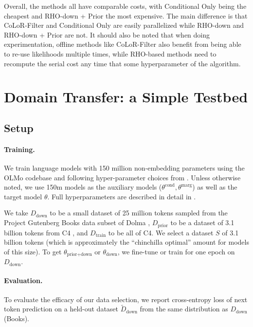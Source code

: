 \documentclass{article}
\newcommand{\Dprior}{D_{\text{prior}}}
\newcommand{\Ddown}{D_{\text{down}}}
\newcommand{\Dtrain}{D_{\text{train}}}
\newcommand{\thetapriordown}{\theta_{\text{prior}+ \text{down}}}
\newcommand{\thetadown}{\theta_{\text{down}}}
\newcommand{\thetacond}{\theta^{\text{cond}}}
\newcommand{\thetamarg}{\theta^{\text{marg}}}
\begin{document}
Overall, the methods all have comparable costs, with Conditional Only being the cheapest and RHO-down + Prior the most expensive. The main difference is that CoLoR-Filter and Conditional Only are easily parallelized while RHO-down and RHO-down + Prior are not. It should also be noted that when doing experimentation, offline methods like CoLoR-Filter also benefit from being able to re-use likelihoods multiple times, while RHO-based methods need to recompute the serial cost any time that some hyperparameter of the algorithm.

\section{Domain Transfer: a Simple Testbed}\label{sec:books}

\subsection{Setup}

\paragraph{Training.} We train language models with 150 million non-embedding parameters using the OLMo codebase \citep{groeneveld2024olmo} and following hyper-parameter choices from \citep{wortsman2024smallscale}. Unless otherwise noted, we use 150m models as the auxiliary models ($ \thetacond, \thetamarg$) as well as the target model $ \theta$. Full hyperparameters are described in detail in . 


We take $ \Ddown$ to be a small dataset of 25 million tokens sampled from the Project Gutenberg Books data subset of Dolma \citep{soldaini2024dolma}, $ \Dprior$ to be a dataset of 3.1 billion tokens from C4 \citep{raffel2020exploring}, and $ \Dtrain$ to be all of C4. 
We select a dataset $ S $ of 3.1 billion tokens (which is approximately the ``chinchilla optimal'' amount for models of this size).
To get $ \thetapriordown$ or $ \thetadown$, we fine-tune or train for one epoch on $ \Ddown$. 

\paragraph{Evaluation.} To evaluate the efficacy of our data selection, we report cross-entropy loss of next token prediction on a held-out dataset $ \widetilde D_{\text{down}}$ from the same distribution as $ \Ddown$ (Books). 
\end{document}
